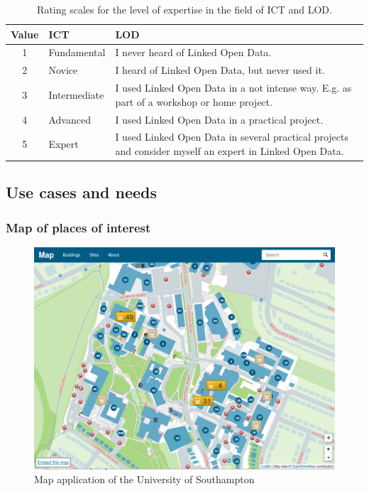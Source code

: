 \documentclass{article}
\begin{document}
\begin{table}[h]
	\begin{tabular}{ c | l  | p{8cm} }
		Value & ICT & LOD\\	
		\hline
		1 & Fundamental & I never heard of Linked Open Data.\\
		\hline
		2 & Novice & I heard of Linked Open Data, but never used it.\\
		\hline
		3 & Intermediate & I used Linked Open Data in a not intense way. E.g. as part of a workshop or home project.\\
		\hline
		4 & Advanced & I used Linked Open Data in a practical project.\\
		\hline
		5 & Expert & I used Linked Open Data in several practical projects and consider myself an expert in Linked Open Data.\\
	\end{tabular}
	\caption{Rating scales for the level of expertise in the field of ICT and LOD.}
	\label{table:interviews-rating scales}
\end{table}

\subsection{Use cases and needs}
\label{lod-benefits-challenges:explored-needs-usecases}


\subsubsection{Map of places of interest}
\label{lod-benefits-challenges:explored-needs-usecases:map}

\begin{figure}[t]
\label{fig:ush-map-app}
\centering \includegraphics*[width=1.0\columnwidth]{images/maps-app/southampton_map_app.png}
\caption{Map application of the University of Southampton}
\end{figure}
\end{document}
